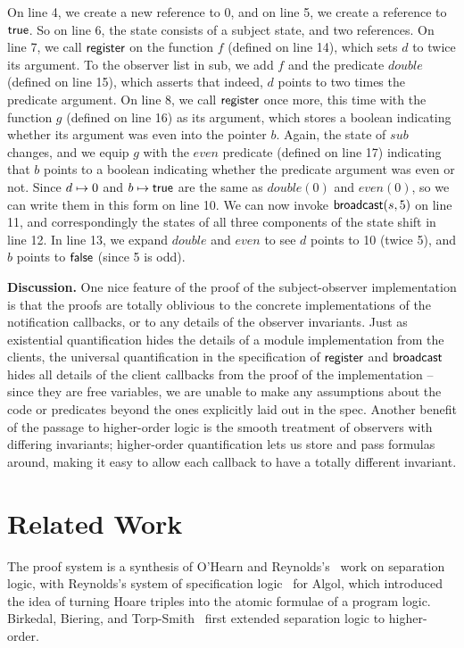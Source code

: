 \documentclass[preprint,natbib]{sigplanconf}
\begin{document}
On line 4, we create a new reference to $0$, and on line 5, we create
a reference to $\mbox{\textsf{{true}}}$. So on line 6, the state consists of a
subject state, and two references.  On line 7, we call
$\mbox{\textsf{{register}}}$ on the function $f$ (defined on line 14), which
sets $d$ to twice its argument. To the observer list in sub, we add
$f$ and the predicate $double$ (defined on line 15), which asserts
that indeed, $d$ points to two times the predicate argument. On line
8, we call $\mbox{\textsf{{register}}}$ once more, this time with the function
$g$ (defined on line 16) as its argument, which stores a boolean
indicating whether its argument was even into the pointer $b$. Again,
the state of $sub$ changes, and we equip $g$ with the $even$ predicate
(defined on line 17) indicating that $b$ points to a boolean
indicating whether the predicate argument was even or not. Since $d
\mapsto 0$ and $b \mapsto \mbox{\textsf{{true}}}$ are the same as
$double(0)$ and $even(0)$, so we can write them in this form on line
10.  We can now invoke $\mbox{\textsf{{broadcast}}}(s, 5)$ on line 11, and
correspondingly the states of all three components of the state shift
in line 12.  In line 13, we expand $double$ and $even$ to see $d$
points to 10 (twice 5), and $b$ points to $\mbox{\textsf{{false}}}$ (since 5
is odd).

\textbf{Discussion.} One nice feature of the proof of the
subject-observer implementation is that the proofs are totally
oblivious to the concrete implementations of the notification
callbacks, or to any details of the observer invariants. Just as
existential quantification hides the details of a module
implementation from the clients, the universal quantification in the
specification of $\mbox{\textsf{{register}}}$ and $\mbox{\textsf{{broadcast}}}$ hides all
details of the client callbacks from the proof of the implementation
-- since they are free variables, we are unable to make any
assumptions about the code or predicates beyond the ones explicitly
laid out in the spec. Another benefit of the passage to higher-order
logic is the smooth treatment of observers with differing invariants;
higher-order quantification lets us store and pass formulas around,
making it easy to allow each callback to have a totally different
invariant. 



\section{Related Work}
The proof system is a synthesis of O'Hearn and
Reynolds's~\cite{sep-logic} work on separation logic, with Reynolds's
system of specification logic~\cite{spec-logic} for Algol, which
introduced the idea of turning Hoare triples into the atomic formulae
of a program logic. Birkedal, Biering, and Torp-Smith~\cite{hosl}
first extended separation logic to higher-order.
\end{document}

